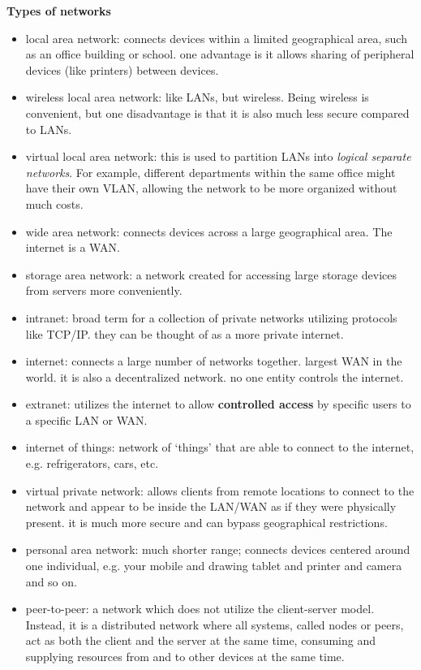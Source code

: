 \documentclass{article}
\begin{document}
\textbf{Types of networks}
\begin{itemize}
    \item local area network: connects devices within a limited geographical
        area, such as an office building or school. one advantage is it allows
        sharing of peripheral devices (like printers) between devices.
    \item wireless local area network: like LANs, but wireless. Being wireless
        is convenient, but one disadvantage is that it is also much less
        secure compared to LANs.
    \item virtual local area network: this is used to partition LANs into
        \textit{logical separate networks}. For example, different departments
        within the same office might have their own VLAN, allowing the network
        to be more organized without much costs.
    \item wide area network: connects devices across a large geographical area.
        The internet is a WAN.
    \item storage area network: a network created for accessing large storage
        devices from servers more conveniently.
    \item intranet: broad term for a collection of private networks utilizing
        protocols like TCP/IP. they can be thought of as a more private
        internet.
    \item internet: connects a large number of networks together. largest WAN
        in the world. it is also a decentralized network. no one entity
        controls the internet.
    \item extranet: utilizes the internet to allow \textbf{controlled access}
        by specific users to a specific LAN or WAN.
    \item internet of things: network of `things' that are able to connect to
        the internet, e.g. refrigerators, cars, etc.
    \item virtual private network: allows clients from remote locations to
        connect to the network and appear to be inside the LAN/WAN as if they
        were physically present. it is much more secure and can bypass
        geographical restrictions.
    \item personal area network: much shorter range; connects devices centered
        around one individual, e.g. your mobile and drawing tablet and printer
        and camera and so on.
    \item peer-to-peer: a network which does not utilize the client-server
        model. Instead, it is a distributed network where all systems, called
        nodes or peers, act as both the client and the server at the same time,
        consuming and supplying resources from and to other devices at the
        same time.
\end{itemize}
\end{document}
